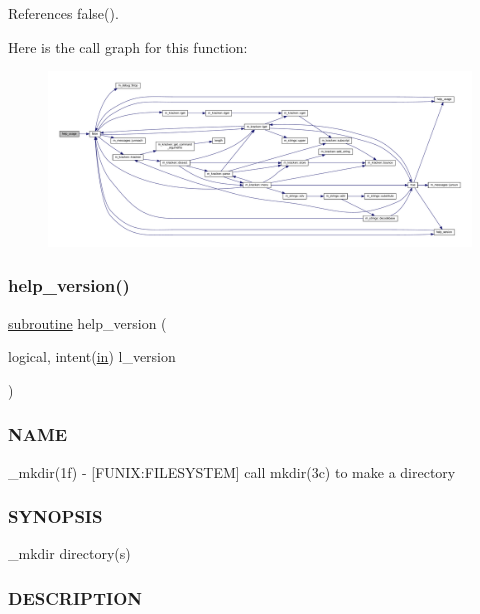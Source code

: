 References false().

Here is the call graph for this function\+:
\nopagebreak
\begin{figure}[H]
\begin{center}
\leavevmode
\includegraphics[width=350pt]{__mkdir_8f90_a3e09a3b52ee8fb04eeb93fe5761626a8_cgraph}
\end{center}
\end{figure}
\mbox{\label{__mkdir_8f90_a39c21619b08a3c22f19e2306efd7f766}} 
\subsubsection{\texorpdfstring{help\+\_\+version()}{help\_version()}}
{\footnotesize\ttfamily \hyperlink{M__stopwatch_83_8txt_acfbcff50169d691ff02d4a123ed70482}{subroutine} help\+\_\+version (\begin{DoxyParamCaption}\item[{logical, intent(\hyperlink{M__journal_83_8txt_afce72651d1eed785a2132bee863b2f38}{in})}]{l\+\_\+version }\end{DoxyParamCaption})}



\subsubsection*{N\+A\+ME}

\+\_\+mkdir(1f) -\/ \mbox{[}F\+U\+N\+IX\+:F\+I\+L\+E\+S\+Y\+S\+T\+EM\mbox{]} call mkdir(3c) to make a directory \subsubsection*{S\+Y\+N\+O\+P\+S\+IS}

\+\_\+mkdir directory(s) \subsubsection*{D\+E\+S\+C\+R\+I\+P\+T\+I\+ON}

